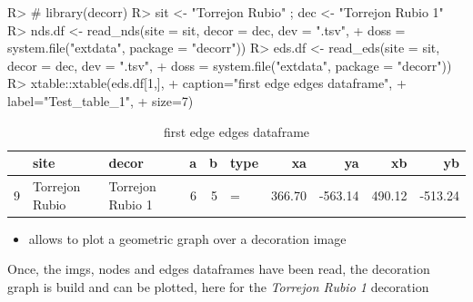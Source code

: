 \documentclass[article]{jss}
\begin{document}
\begin{Schunk}
\begin{Sinput}
R> # library(decorr)
R> sit <- "Torrejon Rubio" ; dec <- "Torrejon Rubio 1"
R> nds.df <- read_nds(site = sit, decor = dec, dev = ".tsv",
+                     doss = system.file("extdata", package = "decorr"))
R> eds.df <- read_eds(site = sit, decor = dec, dev = ".tsv",
+                     doss = system.file("extdata", package = "decorr"))
R> xtable::xtable(eds.df[1,],
+                 caption="first edge edges dataframe",
+                 label="Test_table_1",
+                 size=7)
\end{Sinput}
\begin{table}[ht]
\centering
\begin{tabular}{rllrrlrrrr}
  \hline
 & site & decor & a & b & type & xa & ya & xb & yb \\ 
  \hline
9 & Torrejon Rubio & Torrejon Rubio 1 &   6 &   5 & = & 366.70 & -563.14 & 490.12 & -513.24 \\ 
   \hline
\end{tabular}
\caption{first edge edges dataframe} 
\label{Test_table_1}
\end{table}\end{Schunk}

\begin{itemize}
  \item {} allows to plot a geometric graph over a decoration image
\end{itemize}

Once, the imgs, nodes and edges dataframes have been read, the decoration graph is build and can be plotted, here for the \emph{Torrejon Rubio 1} decoration
\end{document}
